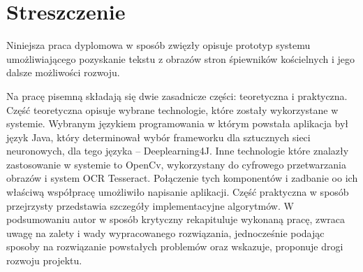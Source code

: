 \documentclass[a4paper,12pt]{article}
\newcommand\spacingIndent{2.2em}
\begin{document}
	\setcounter{page}{2}
	\begin{spacing}{1.4}
	    \noindent\begin{minipage}[s]{\textwidth}
            \tableofcontents
        \end{minipage}
    \end{spacing}
	\newpage 
	
    \section*{Streszczenie}
	     \hspace{\spacingIndent} Niniejsza praca dyplomowa w sposób            zwięzły opisuje prototyp systemu umożliwiającego       pozyskanie tekstu z obrazów stron śpiewników kościelnych i     jego dalsze możliwości rozwoju. 
	     
         Na pracę pisemną składają się dwie zasadnicze części:        teoretyczna i praktyczna. Część teoretyczna opisuje           wybrane technologie, które zostały wykorzystane w             systemie. Wybranym językiem programowania w którym powstała aplikacja był język Java, który determinował wybór frameworku dla sztucznych sieci neuronowych, dla tego języka -- Deeplearning4J. Inne technologie które znalazły zastosowanie w systemie to OpenCv, wykorzystany do cyfrowego przetwarzania obrazów i system OCR Tesseract. Połączenie tych komponentów i zadbanie oo ich właściwą współpracę umożliwiło napisanie aplikacji. Część praktyczna w sposób przejrzysty           przedstawia szczegóły implementacyjne algorytmów. W podsumowaniu        autor w sposób krytyczny rekapituluje wykonaną pracę,          zwraca uwagę na zalety i wady wypracowanego                rozwiązania, jednocześnie podając sposoby na rozwiązanie      powstałych problemów oraz wskazuje, proponuje drogi           rozwoju projektu.   
\end{document}
